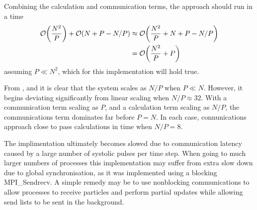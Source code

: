 %
Combining the calculation and communication terms, the \systolicloop{} approach
should run in a time
\begin{equation}
    \begin{split}
        \mathcal{O}{\left({ \frac{N^2}{P} }\right)} + \mathcal{O}{\left({ N + P - N/P }\right)}
            &\approx{} \mathcal{O}{\left({ \frac{N^2}{P} + N + P - N/P }\right)} \\
            &= \mathcal{O}{\left({ \frac{N^2}{P} + P }\right)}
    \end{split}
\end{equation}
assuming $P \ll{} N^2$, which for this implementation will hold true.


%
%
\begin{figure}[!h]
    
    \caption{}
    \label{fig:v0_systolic_pair_operation_512_logtime}
\end  {figure}

\begin{figure}[!h]
    
    \caption{}
    \label{fig:v0_systolic_pair_operation_4096_logtime}
\end  {figure}

\begin{figure}[!h]
    
    \caption{}
    \label{fig:v0_systolic_pair_operation_32768_logtime}
\end  {figure}

\vZeroTimeExplanation
{}
{}
{}
{\pairoperation{}}
{\systolicloop{}}

%
From
,
 and
it is clear that the system scales as $N/P$ when $P \ll{} N$.
%
However, it begins deviating significantly from linear scaling
when $N/P \approx{} 32$.
%
With a communication term scaling as $P$, and a calculation term
scaling as $N/P$, the communications term dominates far before $P = N$.
%
In each case, connunications approach close to pass calculations in time
when $N/P = 8$.

The implimentation ultimately becomes slowed due to
communication latency caused by a large number
of systolic pulses per time step.
%
When going to much larger numbers of processes
this implementation may suffer from extra slow down due to
global synchronisation, as it was implemented using a blocking
MPI\_Sendrecv.
%
A simple remedy may be to use nonblocking communications to allow
processes to receive particles and perform partial updates while
allowing send lists to be sent in the background.
